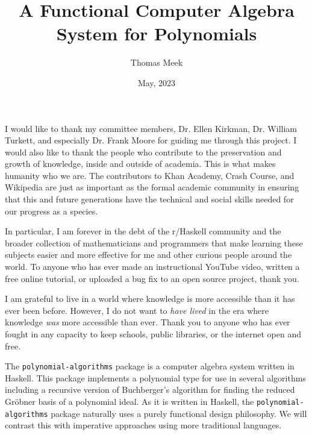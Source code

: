 \documentclass[MS, xcolor=dvipsnames]{wfuthesis}
\theoremstyle{definition}
\begin{document}
\title{A Functional Computer Algebra System for Polynomials}
\author{Thomas Meek}


\date{May, 2023}

\maketitle

\clearpage


\acknowledgments

I would like to thank my committee members, Dr. Ellen Kirkman, Dr. William Turkett, and especially Dr. Frank Moore for guiding me through this project. I would also like to thank the people who contribute to the preservation and growth of knowledge, inside and outside of academia. This is what makes humanity who we are. The contributors to Khan Academy, Crash Course, and Wikipedia are just as important as the formal academic community in ensuring that this and future generations have the technical and social skills needed for our progress as a species. \par
In particular, I am forever in the debt of the r/Haskell community and the broader collection of mathematicians and programmers that make learning these subjects easier and more effective for me and other curious people around the world. To anyone who has ever made an instructional YouTube video, written a free online tutorial, or uploaded a bug fix to an open source project, thank you. \par
I am grateful to live in a world where knowledge is more accessible than it has ever been before. However, I do not want to \emph{have lived} in the era where knowledge \emph{was} more accessible than ever. Thank you to anyone who has ever fought in any capacity to keep schools, public libraries, or the internet open and free.

\tableofcontents

\abstract


The \lstinline{polynomial-algorithms} package is a computer algebra system written in Haskell. This package implements a polynomial type for use in several algorithms including a recursive version of Buchberger's algorithm for finding the reduced Gr\"obner basis of a polynomial ideal. As it is written in Haskell, the \lstinline{polynomial-algorithms} package naturally uses a purely functional design philosophy. We will contrast this with imperative approaches using more traditional languages.
\end{document}
